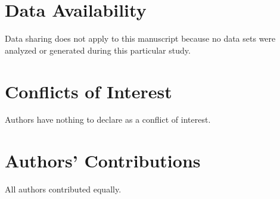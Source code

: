 \documentclass[]{interact}
\theoremstyle{plain}%
\theoremstyle{definition}
\theoremstyle{remark}
\begin{document}
 \section*{Data Availability}
Data sharing does not apply to this manuscript because no data sets were analyzed or generated during this particular study.
\section*{Conflicts of Interest}
Authors have nothing to declare as a conflict of interest.
\section*{Authors’ Contributions}
All authors contributed equally.

  	

 
\end{document}

